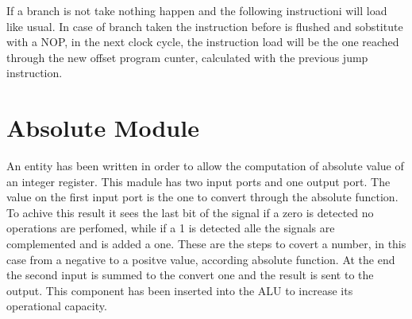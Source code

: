 If a branch is not take nothing happen and the following instructioni will load like usual. 
In case of branch taken the instruction before is flushed and sobstitute with a NOP, 
in the next clock cycle, the instruction load will be the 
one reached through the new offset program cunter, calculated with the previous jump instruction.

\section{Absolute Module}

An entity has been written in order to allow the computation of absolute value of an integer register.
This madule has two input ports and one output port. The value on the first input port is the one to convert 
through the absolute function. To achive this result it sees the last bit of the signal if a zero is detected 
no operations are perfomed, while if a 1 is detected alle the signals are complemented and is added a one. 
These are the steps to covert a number, in this case from a negative to a positve value, according absolute function.
At the end the second input is summed to the convert one and the result is sent to the output.
This component has been inserted into the ALU to increase its operational capacity.